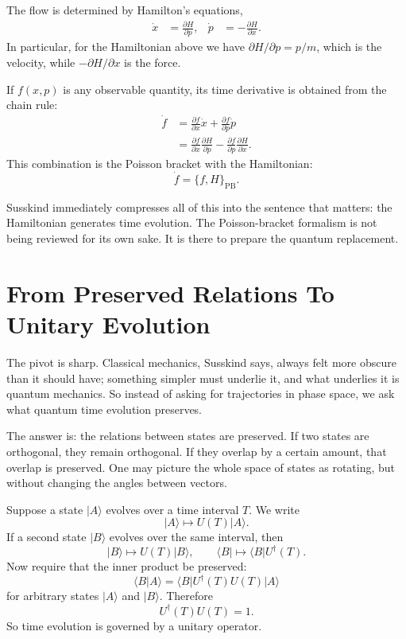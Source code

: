 The flow is determined by Hamilton's equations,
\begin{align}
\dot x &= \frac{\partial H}{\partial p},
&
\dot p &= -\frac{\partial H}{\partial x}.
\end{align}
In particular, for the Hamiltonian above we have $\partial H/\partial p=p/m$, which is the velocity, while $-\partial H/\partial x$ is the force.

If $f(x,p)$ is any observable quantity, its time derivative is obtained from the chain rule:
\begin{align}
\dot f
&=
\frac{\partial f}{\partial x}\dot x
+
\frac{\partial f}{\partial p}\dot p \\
&=
\frac{\partial f}{\partial x}\frac{\partial H}{\partial p}
-
\frac{\partial f}{\partial p}\frac{\partial H}{\partial x}.
\end{align}
This combination is the Poisson bracket with the Hamiltonian:
\begin{equation}
\dot f=\{f,H\}_{\mathrm{PB}}.
\end{equation}

Susskind immediately compresses all of this into the sentence that matters: the Hamiltonian generates time evolution. The Poisson-bracket formalism is not being reviewed for its own sake. It is there to prepare the quantum replacement.

\section{From Preserved Relations To Unitary Evolution}

The pivot is sharp. Classical mechanics, Susskind says, always felt more obscure than it should have; something simpler must underlie it, and what underlies it is quantum mechanics. So instead of asking for trajectories in phase space, we ask what quantum time evolution preserves.

The answer is: the relations between states are preserved. If two states are orthogonal, they remain orthogonal. If they overlap by a certain amount, that overlap is preserved. One may picture the whole space of states as rotating, but without changing the angles between vectors.

Suppose a state $|A\rangle$ evolves over a time interval $T$. We write
\begin{equation}
|A\rangle \mapsto U(T)|A\rangle.
\end{equation}
If a second state $|B\rangle$ evolves over the same interval, then
\begin{equation}
|B\rangle \mapsto U(T)|B\rangle,
\qquad
\langle B| \mapsto \langle B|U^\dagger(T).
\end{equation}
Now require that the inner product be preserved:
\begin{equation}
\langle B|A\rangle
=
\langle B|U^\dagger(T)U(T)|A\rangle
\end{equation}
for arbitrary states $|A\rangle$ and $|B\rangle$. Therefore
\begin{equation}
U^\dagger(T)U(T)=1.
\end{equation}
So time evolution is governed by a unitary operator.

